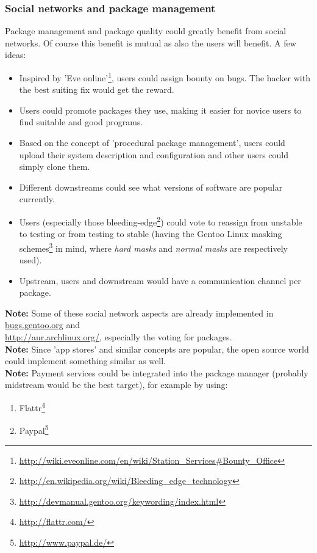 \documentclass[a4paper,10pt]{article}
\begin{document}
\subsubsection{Social networks and package management}
Package management and package quality could greatly benefit from social networks. Of course this benefit is mutual as also the users will benefit. A few ideas:
\begin{itemize}
\item Inspired by 'Eve online'\footnote{\url{http://wiki.eveonline.com/en/wiki/Station_Services\#Bounty_Office}}, users could assign bounty on bugs. The hacker with the best suiting fix would get the reward.
\item Users could promote packages they use, making it easier for novice users to find suitable and good programs.
\item Based on the concept of 'procedural package management', users could upload their system description and configuration and other users could simply clone them.
\item Different downstreams could see what versions of software are popular currently.
\item Users (especially those bleeding-edge\footnote{\url{http://en.wikipedia.org/wiki/Bleeding_edge_technology}}) could vote to reassign from unstable to testing or from testing to stable (having the Gentoo Linux masking schemes\footnote{\url{http://devmanual.gentoo.org/keywording/index.html}} in mind, where \textit{hard masks} and \textit{normal masks} are respectively used).
\item Upstream, users and downstream would have a communication channel per package.
\end{itemize}
\textbf{Note:} Some of these social network aspects are already implemented in \mbox{\url{bugs.gentoo.org}} and \\ \mbox{\url{http://aur.archlinux.org/}}, especially the voting for packages.\\

\textbf{Note:} Since 'app stores' and similar concepts are popular, the open source world could implement something similar as well. \\

\textbf{Note:} Payment services could be integrated into the package manager (probably midstream would be the best target), for example by using: 
\begin{enumerate}
\item Flattr\footnote{\url{http://flattr.com/}}
\item Paypal\footnote{\url{http://www.paypal.de/}}
\end{enumerate}
\end{document}
